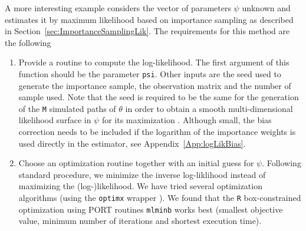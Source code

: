 \documentclass{article}
\newcommand{\R}{\texttt{R}\xspace}
\begin{document}
A more interesting example considers the vector of parameters $\psi$ unknown and estimates it by maximum likelihood based on importance sampling as described in Section~\ref{sec:ImportanceSamplingLik}. The requirements for this method are the following
\begin{enumerate}
\item Provide a routine to compute the log-likelihood. The first argument of this function
  should be the parameter \texttt{psi}. Other inputs are the seed used to generate the
  importance sample, the observation matrix and the number of sample used. Note that the seed
  is required to be the same for the generation of the \texttt{M} simulated paths of $\theta$
  in order to obtain a smooth multi-dimensional likelihood surface in $\psi$ for its
  maximization \citep{jungbacker2007monte}. Although small, the bias correction needs to be included if the logarithm of the importance weights is used directly in the estimator, see Appendix~\ref{App:logLikBias}.
\begin{Schunk}
\end{Schunk}

\item Choose an optimization routine together with an initial guess for $\psi$. Following
  standard procedure, we minimize the inverse log-liklihood instead of maximizing the
  (log-)likelihood. We have tried several optimization algorithms (using the \texttt{optimx}
  wrapper \citep[see ]{optimx2014}). We found that the \R box-constrained optimization using
  PORT routines \texttt{mlminb} works best (smallest objective value, minimum number of
  iterations and shortest execution time).
\begin{Schunk}
\end{Schunk}
\end{enumerate}
\end{document}
